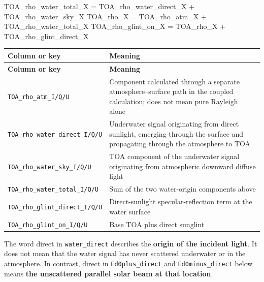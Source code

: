 \begin{ManualCode}
TOA_rho_water_total_X = TOA_rho_water_direct_X + TOA_rho_water_sky_X
TOA_rho_X = TOA_rho_atm_X + TOA_rho_water_total_X
TOA_rho_glint_on_X = TOA_rho_X + TOA_rho_glint_direct_X
\end{ManualCode}


{\TableFont
\begin{longtable}{@{}>{\raggedright\arraybackslash}p{}>{\raggedright\arraybackslash}p{}@{}}
\toprule
\textbf{Column or key} & \textbf{Meaning} \\
\midrule
\endfirsthead
\toprule
\textbf{Column or key} & \textbf{Meaning} \\
\midrule
\endhead
\bottomrule
\endfoot
\texttt{TOA\_\allowbreak{}rho\_\allowbreak{}atm\_\allowbreak{}I/\allowbreak{}Q/\allowbreak{}U} & Component calculated through a separate atmosphere--surface path in the coupled calculation; does not mean pure Rayleigh alone \\
\texttt{TOA\_\allowbreak{}rho\_\allowbreak{}water\_\allowbreak{}direct\_\allowbreak{}I/\allowbreak{}Q/\allowbreak{}U} & Underwater signal originating from direct sunlight, emerging through the surface and propagating through the atmosphere to TOA \\
\texttt{TOA\_\allowbreak{}rho\_\allowbreak{}water\_\allowbreak{}sky\_\allowbreak{}I/\allowbreak{}Q/\allowbreak{}U} & TOA component of the underwater signal originating from atmospheric downward diffuse light \\
\texttt{TOA\_\allowbreak{}rho\_\allowbreak{}water\_\allowbreak{}total\_\allowbreak{}I/\allowbreak{}Q/\allowbreak{}U} & Sum of the two water-origin components above \\
\texttt{TOA\_\allowbreak{}rho\_\allowbreak{}glint\_\allowbreak{}direct\_\allowbreak{}I/\allowbreak{}Q/\allowbreak{}U} & Direct-sunlight specular-reflection term at the water surface \\
\texttt{TOA\_\allowbreak{}rho\_\allowbreak{}glint\_\allowbreak{}on\_\allowbreak{}I/\allowbreak{}Q/\allowbreak{}U} & Base TOA plus direct sunglint \\
\end{longtable}
}

The word direct in \texttt{water\_\allowbreak{}direct} describes the \textbf{origin of the incident light}. It does not mean that the water signal has never scattered underwater or in the atmosphere. In contrast, direct in \texttt{Ed0plus\_\allowbreak{}direct} and \texttt{Ed0minus\_\allowbreak{}direct} below means \textbf{the unscattered parallel solar beam at that location}.

